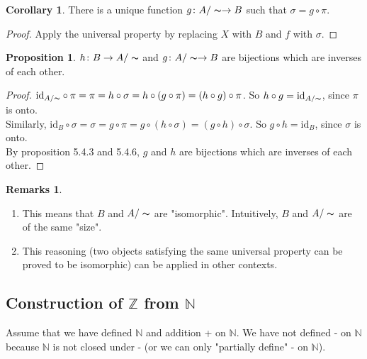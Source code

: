 \documentclass[14pt]{article}
\theoremstyle{definition}
\newtheorem*{remark}{Remarks}
\newtheorem{proposition}[definition]{Proposition}
\newtheorem{coro}[definition]{Corollary}
\newcommand{\eq}{\thicksim}
\newcommand{\fun}[3]{#1\colon #2\rightarrow#3}
\newcommand{\bb}[1]{\mathbb{#1}}
\begin{document}
\vspace{2mm}

\begin{coro}
There is a unique function $\fun{g}{A/\eq}{B}$ such that $\sigma=g\circ \pi$.
\end{coro}

\begin{proof}
  Apply the universal property by replacing $X$ with $B$ and $f$ with $\sigma$.  
\end{proof}

\vspace{3mm}

\begin{proposition}
    $\fun{h}{B}{A/\eq}$ and $\fun{g}{A/\eq}{B}$ are bijections which are inverses of each other.
\end{proposition}

\begin{proof}
    $\mathrm{id}_{A/\eq}\circ \pi=\pi=h\circ \sigma=h\circ (g\circ \pi)=(h\circ g)\circ \pi$.  So $h\circ g=\mathrm{id}_{A/\eq}$, since $\pi$ is onto.\\
    Similarly, $\mathrm{id}_{B}\circ \sigma=\sigma=g\circ \pi=g\circ (h\circ \sigma)=(g\circ h)\circ \sigma$.  So $g\circ h=\mathrm{id}_{B}$, since $\sigma$ is onto.\\
    By proposition 5.4.3 and 5.4.6, $g$ and $h$ are bijections which are inverses of each other.
\end{proof}
\begin{remark}
    \hfill
    \begin{enumerate}
        \item This means that $B$ and $A/\eq$ are "isomorphic". Intuitively, $B$ and $A/\eq$ are of the same "size".
        \item This reasoning (two objects satisfying the same universal property can be proved to be isomorphic) can be applied in other contexts.
    \end{enumerate}
\end{remark}

\vspace{5mm}

\subsection{Construction of $\bb{Z}$ from $\bb{N}$ }
Assume that we have defined $\bb{N}$  and addition + on $\bb{N}$. We have not defined - on $\bb{N}$
because $\bb{N}$ is not closed under - (or we can only "partially define" - on $\bb{N}$).
\end{document}
